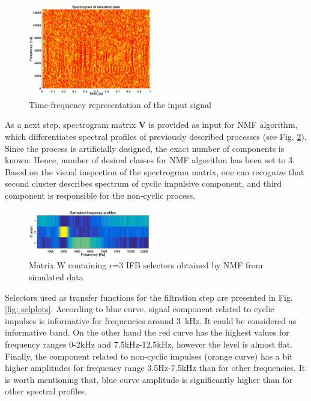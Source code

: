 \documentclass[journal]{IEEEtran}
\begin{document}
\begin{figure}[!ht]
\centering
\includegraphics[width = 0.48\textwidth]{figs3/input_spec.eps}
\caption{Time-frequency representation of the input signal}
\label{fig: spectrogram}
\end{figure}

As a next step, spectrogram matrix \textbf{V} is provided as input for NMF algorithm, which differentiates spectral profiles of previously described processes (see Fig. \ref{fig: selmat}). Since the process is artificially designed, the exact number of components is known. Hence, number of desired classes for NMF algorithm has been set to 3. Based on the visual inspection of the spectrogram matrix, one can recognize that second cluster describes spectrum of cyclic impulsive component, and third component is responsible for the non-cyclic process.

\begin{figure}[!ht]
\centering
\includegraphics[width = 0.48\textwidth]{figs3/selector_matrix.png}
\caption{Matrix W containing r=3 IFB selectors obtained by NMF from simulated data}
\label{fig: selmat}
\end{figure}

Selectors used as transfer functions for the filtration step are presented in Fig. \ref{fig: selplots}. According to blue curve, signal component related to cyclic impulses is informative for frequencies around 3~kHz. It could be considered as informative band. On the other hand the red curve has the highest values for frequency ranges 0-2kHz and 7.5kHz-12.5kHz, however the level is almost flat. Finally, the component related to non-cyclic impulses (orange curve) has a bit higher amplitudes for frequency range 3.5Hz-7.5kHz than for other frequencies. It is worth mentioning that, blue curve amplitude is significantly higher than for other spectral profiles.
\end{document}
